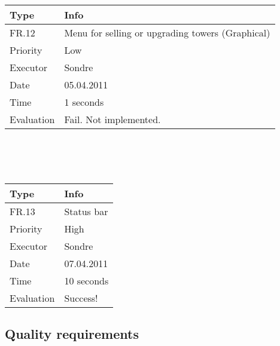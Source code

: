   \\
  \\
  \\
  \begin{tabular}{|l | p{10cm} |}
	\hline	
	\textbf{Type} & \textbf{Info} \\
	\hline
	FR.12 & Menu for selling or upgrading towers (Graphical) \\
	\hline
	Priority & Low  \\
	\hline
	Executor & Sondre  \\
	\hline
	Date & 05.04.2011 \\
	\hline
	Time & 1 seconds \\
	\hline
	Evaluation & Fail. Not implemented. \\
	\hline
  \end{tabular}
  \\
  \\
  \\
  \begin{tabular}{|l | p{10cm} |}
	\hline	
	\textbf{Type} & \textbf{Info} \\
	\hline
	FR.13 & Status bar \\
	\hline
	Priority & High  \\
	\hline
	Executor & Sondre  \\
	\hline
	Date & 07.04.2011 \\
	\hline
	Time & 10 seconds \\
	\hline
	Evaluation & Success! \\
	\hline
  \end{tabular}

\subsection{Quality requirements}

